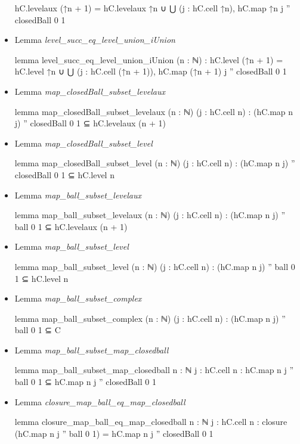 \documentclass[colorinlistoftodos]{article}
\begin{document}
\begin{itemize}
\begin{leancode}
  hC.levelaux (↑n + 1) = hC.levelaux ↑n ∪ ⋃ (j : hC.cell ↑n), hC.map ↑n j '' closedBall 0 1
\end{leancode}
  \item Lemma \emph{level\_succ\_eq\_level\_union\_iUnion}
\begin{leancode}
lemma level_succ_eq_level_union_iUnion (n : ℕ) : 
  hC.level (↑n + 1) = 
  hC.level ↑n ∪ ⋃ (j : hC.cell (↑n + 1)), hC.map (↑n + 1) j '' closedBall 0 1
\end{leancode}
  \item Lemma \emph{map\_closedBall\_subset\_levelaux}
\begin{leancode}
lemma map_closedBall_subset_levelaux (n : ℕ) (j : hC.cell n) : 
  (hC.map n j) '' closedBall 0 1 ⊆ hC.levelaux (n + 1)
\end{leancode}
  \item Lemma \emph{map\_closedBall\_subset\_level}
\begin{leancode}
lemma map_closedBall_subset_level (n : ℕ) (j : hC.cell n) : 
  (hC.map n j) '' closedBall 0 1 ⊆ hC.level n
\end{leancode}
  \item Lemma \emph{map\_ball\_subset\_levelaux}
\begin{leancode}
lemma map_ball_subset_levelaux (n : ℕ) (j : hC.cell n) : 
  (hC.map n j) '' ball 0 1 ⊆ hC.levelaux (n + 1)
\end{leancode}
  \item Lemma \emph{map\_ball\_subset\_level}
\begin{leancode}
lemma map_ball_subset_level (n : ℕ) (j : hC.cell n) : 
  (hC.map n j) '' ball 0 1 ⊆ hC.level n
\end{leancode}
  \item Lemma \emph{map\_ball\_subset\_complex}
\begin{leancode}
lemma map_ball_subset_complex (n : ℕ) (j : hC.cell n) : 
  (hC.map n j) '' ball 0 1 ⊆ C
\end{leancode}
  \item Lemma \emph{map\_ball\_subset\_map\_closedball}
\begin{leancode}
lemma map_ball_subset_map_closedball {n : ℕ} {j : hC.cell n} :
  hC.map n j '' ball 0 1 ⊆ hC.map n j '' closedBall 0 1
\end{leancode}
  \item Lemma \emph{closure\_map\_ball\_eq\_map\_closedball}
\begin{leancode}
lemma closure_map_ball_eq_map_closedball {n : ℕ} {j : hC.cell n} : 
  closure (hC.map n j '' ball 0 1) = hC.map n j '' closedBall 0 1

\end{leancode}
\end{itemize}
\end{document}
